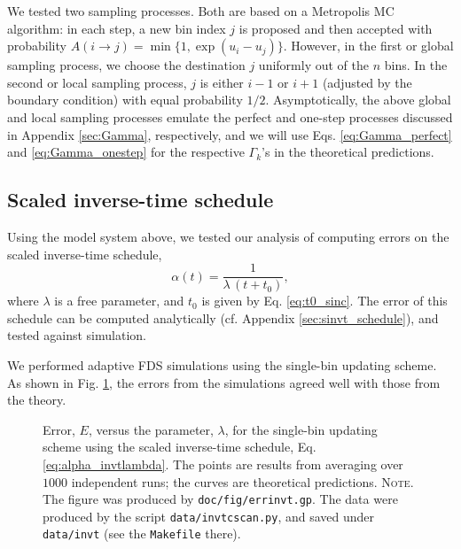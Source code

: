 \documentclass[preprint, floatfix]{revtex4-1}
\newcommand{\note}[1]{{\color{DarkGreen}\footnotesize \textsc{Note.} #1}}
\newcommand{\Err}{E}
\begin{document}
We tested two sampling processes.
%
Both are based on
a Metropolis MC algorithm\cite{
  metropolis1953, newman, frenkel,
  landau_binder}:
%
in each step, a new bin index $j$ is proposed
and then accepted with probability
%
$
A(i \to j) = \min\{ 1, \exp(u_i - u_j) \}.
$
However,
in the first or global sampling process,
we choose the destination $j$
uniformly out of the $n$ bins.
%
In the second or local sampling process,
$j$ is either $i - 1$ or $i + 1$
(adjusted by the boundary condition)
with equal probability $1/2$.
%
Asymptotically,
the above global and local sampling processes
emulate the perfect and one-step processes
discussed in Appendix \ref{sec:Gamma},
respectively,
and we will use
Eqs. \eqref{eq:Gamma_perfect}
and \eqref{eq:Gamma_onestep}
for the respective $\Gamma_k$'s
in the theoretical predictions.
%



\subsection{\label{sec:results_invt}
Scaled inverse-time schedule}


Using the model system above, we
tested our analysis of computing errors
on the scaled inverse-time schedule,
%
\begin{equation}
\alpha(t) = \frac{1}{\lambda \, (t + t_0) },
\label{eq:alpha_invtlambda}
\end{equation}
%
where $\lambda$ is a free parameter,
and $t_0$ is given by Eq. \eqref{eq:t0_sinc}.
%
The error of this schedule
can be computed analytically
(cf. Appendix \ref{sec:sinvt_schedule}),
and tested against simulation.



We performed adaptive FDS simulations
using the single-bin updating scheme.
%
%
As shown in Fig. \ref{fig:errinvt},
the errors from the simulations
agreed well with those from the theory.


\begin{figure}[h]
\begin{center}
  \caption{
    \label{fig:errinvt}
    Error, $\Err$, versus the parameter, $\lambda$,
    for the single-bin updating scheme
    using the scaled inverse-time schedule,
    Eq. \eqref{eq:alpha_invtlambda}.
    The points are results from averaging over $1000$ independent runs;
    the curves are theoretical predictions.
    \note{The figure was produced by \texttt{doc/fig/errinvt.gp}.
      The data were produced by the script \texttt{data/invtcscan.py},
      and saved under \texttt{data/invt}
      (see the \texttt{Makefile} there).
    }%
  }
\end{center}
\end{figure}
\end{document}
